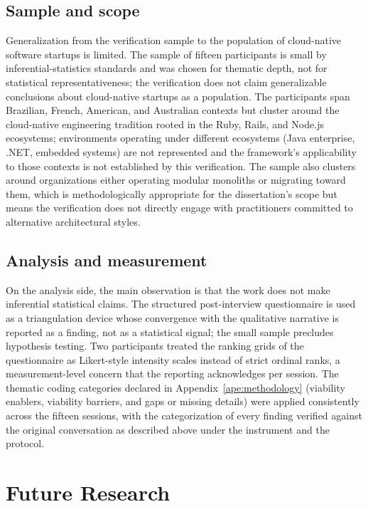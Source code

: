\subsection*{Sample and scope}

Generalization from the verification sample to the population of cloud-native software startups is limited. The sample of fifteen participants is small by inferential-statistics standards and was chosen for thematic depth, not for statistical representativeness; the verification does not claim generalizable conclusions about cloud-native startups as a population. The participants span Brazilian, French, American, and Australian contexts but cluster around the cloud-native engineering tradition rooted in the Ruby, Rails, and Node.js ecosystems; environments operating under different ecosystems (Java enterprise, .NET, embedded systems) are not represented and the framework's applicability to those contexts is not established by this verification. The sample also clusters around organizations either operating modular monoliths or migrating toward them, which is methodologically appropriate for the dissertation's scope but means the verification does not directly engage with practitioners committed to alternative architectural styles.

\subsection*{Analysis and measurement}

On the analysis side, the main observation is that the work does not make inferential statistical claims. The structured post-interview questionnaire is used as a triangulation device whose convergence with the qualitative narrative is reported as a finding, not as a statistical signal; the small sample precludes hypothesis testing. Two participants treated the ranking grids of the questionnaire as Likert-style intensity scales instead of strict ordinal ranks, a measurement-level concern that the reporting acknowledges per session. The thematic coding categories declared in Appendix~\ref{ape:methodology} (viability enablers, viability barriers, and gaps or missing details) were applied consistently across the fifteen sessions, with the categorization of every finding verified against the original conversation as described above under the instrument and the protocol.

\section{Future Research}

